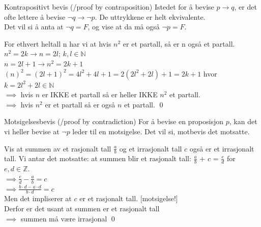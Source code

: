\begin{frame}{Kontrapositivt bevis (/proof by contraposition)}
    Istedet for å bevise $p \rightarrow q$, er det ofte lettere å bevise $\lnot q \rightarrow \lnot p$. De uttrykkene er helt ekvivalente.\\
    Det vil si å anta at $\lnot q = F$, og vise at da må også $\lnot p = F$.\\
    
    \pause
    \begin{block}{For ethvert heltall n har vi at hvis $n^2$ er et partall, så er n også et partall.}
        $n^2=2k \rightarrow n=2l$;    $k,l\in\mathbb{N}$\\
    \pause
        $n=2l+1 \rightarrow n^2=2k+1$\\
        $(n)^2=(2l+1)^2=4l^2+4l+1=2(2l^2+2l)+1=2k+1$ hvor $k=2l^2+2l \in\mathbb{N}$\\
    \pause
        $\implies$ hvis $n$ er IKKE et partall så er heller IKKE $n^2$ et partall.\\
        $\implies$ hvis $n^2$ er et partall så er også $n$ et partall.
        \qed
    \end{block}
\end{frame}

\begin{frame}{Motsigelsesbevis (/proof by contradiction)}
    For å bevise en proposisjon $p$, kan det vi heller bevise at $\lnot p$ leder til en motsigelse. Det vil si, motbevis det motsatte.
    
    \pause
    \begin{block}{Vis at summen av et rasjonalt tall $\frac{a}{b}$ og et irrasjonalt tall $c$ også er et irrasjonalt tall.}
    Vi antar det motsatte: at summen blir et rasjonalt tall: $\frac{a}{b}$ + $c$ = $\frac{e}{d}$ for $e, d \in \mathbb{Z}$.\\
    $\implies \frac{e}{d} - \frac{a}{b} = c$\\
    $\implies \frac{b\cdot d - a \cdot d}{b\cdot d} = c$\\
    Men det impliserer at $c$ er et rasjonalt tall. [motsigelse!]\\
    Derfor er det usant at summen er et rasjonalt tall\\
    $\implies$ summen må være irrasjonal
    \qed
    
    \end{block}
\end{frame}

